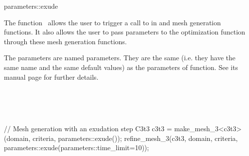 \ccRefPageBegin


\begin{ccRefFunction}{parameters::exude}  %


\ccDefinition
  
The function \ccRefName\ allows the user to trigger a call to  in
 and  mesh generation functions.
It also allows the user to pass parameters
to the optimization function  through these mesh generation functions.




\ccParameters

The parameters are named parameters. They are the same (i.e. they have the same
name and the same default values) as the parameters of 
function. See its manual page for further details.


\ccSeeAlso

 \\
 \\
 \\


\ccExample

\begin{ccExampleCode}
// Mesh generation with an exudation step
C3t3 c3t3 = make_mesh_3<c3t3>(domain, criteria, parameters::exude());
refine_mesh_3(c3t3, domain, criteria, parameters::exude(parameters::time_limit=10));
\end{ccExampleCode}


\end{ccRefFunction}

\ccRefPageEnd

